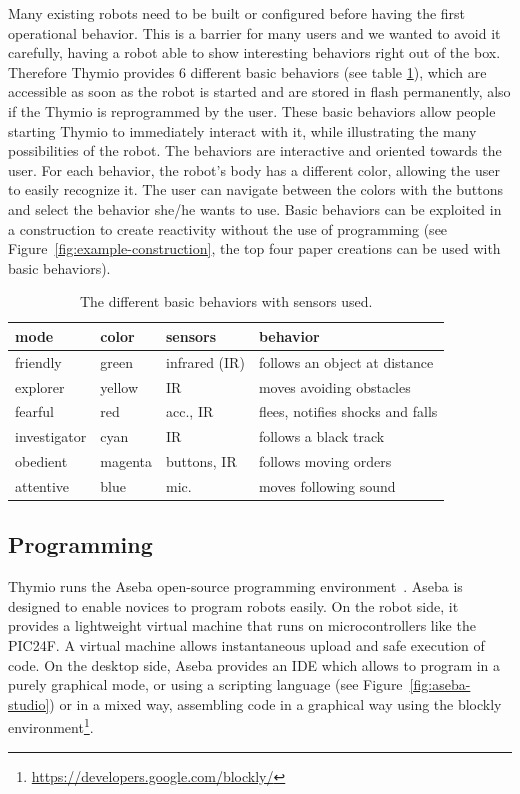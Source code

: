 \documentclass[letterpaper, 10 pt, conference]{ieeeconf}  %
\begin{document}
Many existing robots need to be built or configured before having the first operational behavior. 
This is a barrier for many users and we wanted to avoid it carefully, having a robot able to show interesting behaviors right out of the box.
Therefore Thymio provides 6 different basic behaviors (see table \ref{tbl:basic-behaviors}), which are accessible as soon as the robot is started and are stored in flash permanently, also if the Thymio is reprogrammed by the user.
These basic behaviors allow people starting Thymio to immediately interact with it, while illustrating the many possibilities of the robot.
The behaviors are interactive and oriented towards the user. %
For each behavior, the robot's body has a different color, allowing the user to easily recognize it.
The user can navigate between the colors with the buttons and select the behavior she/he wants to use.
Basic behaviors can be exploited in a construction to create reactivity without the use of programming (see Figure~\ref{fig:example-construction}, the top four paper creations can be used with basic behaviors).

\begin{table}
\begin{tabularx}{\columnwidth}{@{}llll@{}}
\toprule
mode & color & sensors & behavior \\
\midrule
friendly & green & infrared (IR) & follows an object at distance \\
explorer & yellow & IR & moves avoiding obstacles \\
fearful & red & acc., IR & flees, notifies shocks and falls \\
investigator & cyan & IR & follows a black track \\
obedient & magenta & buttons, IR & follows moving orders \\
attentive & blue & mic. & moves following sound \\
\bottomrule
\end{tabularx}
\caption{The different basic behaviors with sensors used.}
\label{tbl:basic-behaviors}
\end{table}


\subsection{Programming}
\label{sec:aseba}

Thymio runs the Aseba open-source programming environment~\cite{aseba}.
Aseba is designed to enable novices to program robots easily.
On the robot side, it provides a lightweight virtual machine that runs on microcontrollers like the PIC24F.
A virtual machine allows instantaneous upload and safe execution of code.
On the desktop side, Aseba provides an IDE which allows to program in a purely graphical mode, or using a scripting language (see Figure~\ref{fig:aseba-studio}) or in a mixed way, assembling code in a graphical way using the blockly environment\footnote{\url{https://developers.google.com/blockly/}}.
\end{document}
